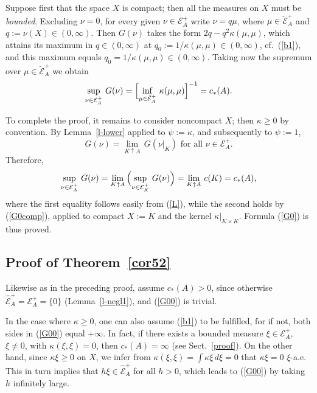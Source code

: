 \documentclass[12pt,a4paper,reqno]{amsart} %
\theoremstyle{lause}
\theoremstyle{maaritelma}
\theoremstyle{lause}
\theoremstyle{maaritelma}
\numberwithin{equation}{section}
\begin{document}
Suppose first that the space $X$ is compact; then all the measures on $X$ must be {\it bounded}. Excluding $\nu=0$, for every given $\nu\in\mathcal E^+_A$ write $\nu=q\mu$, where $\mu\in\breve{\mathcal E}^+_A$ and $q:=\nu(X)\in(0,\infty)$. Then $G(\nu)$ takes the form
$2q-q^2\kappa(\mu,\mu)$,
which attains its maximum in $q\in(0,\infty)$ at $q_0:=1/\kappa(\mu,\mu)\in(0,\infty)$, cf.\ (\ref{b1}), and this maximum equals $q_0=1/\kappa(\mu,\mu)\in(0,\infty)$. Taking now the supremum over $\mu\in\breve{\mathcal E}^+_A$ we obtain
\begin{equation}\label{G0comp}
\sup_{\nu\in\mathcal E^+_A}\,G(\nu)=\Bigl[\inf_{\mu\in\breve{\mathcal E}^+_A}\,\kappa(\mu,\mu)\Bigr]^{-1}=c_*(A).
\end{equation}

To complete the proof, it remains to consider noncompact $X$; then $\kappa\geqslant0$ by convention.
By Lemma~\ref{l-lower} applied to $\psi:=\kappa$, and subsequently to $\psi:=1$,
\begin{equation}\label{L}
 G(\nu)=\lim_{K\uparrow A}\,G(\nu|_K)\text{ \ for all $\nu\in\mathcal E^+_A$}.
\end{equation}
Therefore,
\[\sup_{\nu\in\mathcal E^+_A}\,G(\nu)=\lim_{K\uparrow A}\,\Bigl(\sup_{\nu\in\mathcal E^+_K}\,G(\nu)\Bigr)=\lim_{K\uparrow A}\,c(K)=c_*(A),\]
where the first equality follows easily from (\ref{L}), while the second holds by (\ref{G0comp}), applied to compact $X:=K$ and the kernel $\kappa|_{K\times K}$.  Formula (\ref{G0}) is thus proved.

\subsection{Proof of Theorem~\ref{cor52}}\label{prooff}
Likewise as in the preceding proof, assume $c_*(A)>0$, since otherwise $\widehat{\mathcal E}^+_A=\mathcal E^+_A=\{0\}$ (Lemma~\ref{l-negl1}), and (\ref{G00}) is trivial.

In the case where $\kappa\geqslant0$, one can also assume (\ref{b1}) to be fulfilled,
for if not, both sides in (\ref{G00}) equal $+\infty$. In fact, if there exists a bounded measure $\xi\in\mathcal E^+_A$, $\xi\ne0$, with $\kappa(\xi,\xi)=0$, then $c_*(A)=\infty$ (see Sect.~\ref{proof}). On the other hand, since $\kappa\xi\geqslant0$ on $X$, we infer from $\kappa(\xi,\xi)=\int\kappa\xi\,d\xi=0$ that $\kappa\xi=0$ $\xi$-a.e. This in turn implies that $h\xi\in\widehat{\mathcal E}^+_A$ for all $h>0$, which leads to (\ref{G00}) by taking $h$ infinitely large.
\end{document}
